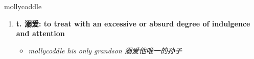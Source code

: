 
\begin{frame}
{\huge mollycoddle}
\begin{center}
\begin{enumerate}\Large
  \item \textbf{t. 溺爱: to treat with an excessive or absurd degree of indulgence and attention}
  \begin{itemize}
    \item \em{\Large{mollycoddle his only grandson 溺爱他唯一的孙子}}
  \end{itemize}
\end{enumerate}
\end{center}
\end{frame}
